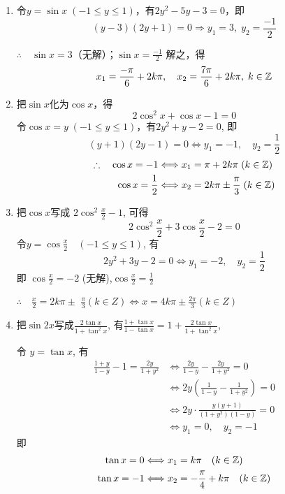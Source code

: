 \begin{solution}
\begin{enumerate}[(1)]
    \item 令$y=\sin x\; (-1\le y\le 1)$，有$2y^2-5y-3=0$，即$$(y-3)(2y+1)=0\Rightarrow y_1=3,\; y_2=\frac{-1}{2}$$

$\therefore\quad \sin x=3$（无解）；$\sin x=\frac{-1}{2}$ 解之，得
\[x_1=\dfrac{-\pi}{6}+2k\pi,\quad x_2=\dfrac{7\pi}{6}+2k\pi,\; k\in\mathbb{Z}\]
\item 把$\sin x$化为$\cos x$，得
\[2\cos^2x+\cos x-1=0\]
令$\cos x=y\; (-1\le y\le 1)$，有$2y^2+y-2=0$,
即$$(y+1)(2y-1)=0\Longleftrightarrow y_1=-1,\quad y_2=\frac{1}{2}$$
\[\begin{split}
    \therefore\quad \cos x=-1 &\Longleftrightarrow x_1=\pi+2k\pi \; (k\in\mathbb{Z})\\
    \cos x=\dfrac{1}{2}&\Longleftrightarrow x_2=2k\pi \pm \dfrac{\pi}{3}\; (k\in\mathbb{Z})
\end{split}\]
\item 把$\cos x$写成 $2\cos^2\frac x2-1$, 可得
$$2\cos ^{2}\frac x2+ 3\cos \frac x2- 2= 0$$
令$y=\cos\frac{x}{2}\quad (-1\leqslant y\leqslant1)$, 有
$$2y^{2}+ 3y- 2= 0\Longleftrightarrow y_{1}= - 2,\quad y_{2}= \frac 12$$
即 $\cos \frac x2= - 2$ (无解),\quad $\cos\frac x2=\frac12$

$\therefore\quad \frac x2= 2k\pi \pm$ $\frac \pi 3\left ( k\in Z\right ) \Longleftrightarrow x= 4k\pi \pm \frac {2\pi }3\left ( k\in Z\right ) $

\item 把$\sin2x$写成$\frac{2\tan x}{1+\tan ^{2}x}$, 有$\frac {1+ \tan x}{1- \tan x}= 1+ \frac {2\tan x}{1+ \tan ^{2}x}$,

令 $y= \tan x$, 有
\[\begin{split}
    \frac {1+ y}{1- y}- 1= \frac {2y}{1+ y^{2}}&\Longleftrightarrow \frac {2y}{1- y}- \frac {2y}{1+ y^{2}}= 0\\
    &\Longleftrightarrow 2y\left(\frac{1}{1-y}-\frac{1}{1+y^{2}}\right)=0\\
    &\Longleftrightarrow 2y\cdot\frac{y(y+1)}{(1+y^{2})(1-y)}=0\\
    &\Longleftrightarrow y_{1}= 0,\quad y_{2}= - 1
\end{split}\]
即 
\[\begin{split}
    \tan x= 0&\Longleftrightarrow x_1= k\pi\quad ( k\in \mathbb{Z}) \\
    \tan x= -1&\Longleftrightarrow x_{2}= - \dfrac \pi 4+ k\pi\quad ( k\in \mathbb{Z}) 
\end{split}\]
\end{enumerate}
\end{solution}

